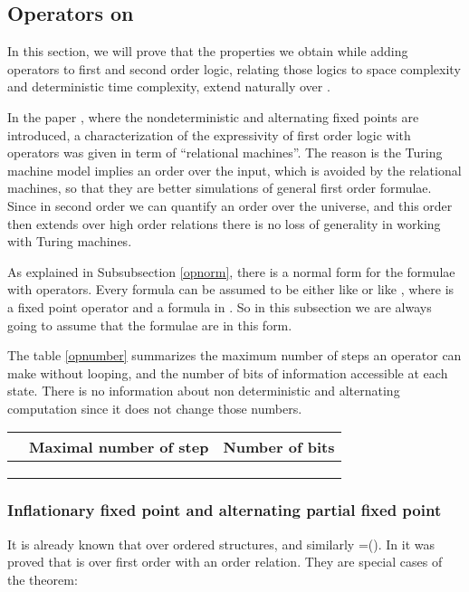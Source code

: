 \documentclass[a4paper,12pt]{article}
\newcommand{\sss}[1]{\subsubsection{#1}}
\theoremstyle{definition}
\begin{document}
\subsection{Operators on \HO}
In this section, we will prove that the properties we obtain while
adding operators to first and second order logic, relating those
logics to space complexity and deterministic time complexity, extend
naturally over \HO.

In the paper \cite{nfp}, where the nondeterministic and alternating
fixed points are introduced, a characterization of the expressivity of
first order logic with operators was given in term of ``relational
machines''. The reason is the Turing machine model implies an order
over the input, which is avoided by the relational machines, so that
they are better simulations of general first order formulae. Since in
second order we can quantify an order over the universe, and this
order then extends over high order relations there is no loss of
generality in working with Turing machines.

As explained in Subsubsection \ref{opnorm}, there is a normal form for
the formulae with operators. Every formula can be assumed to be
either like  or like , where  is a fixed point operator and  a
formula in . So in this subsection we are always going to assume
that the formulae are in this form.

The table \ref{opnumber} summarizes the maximum number of steps an operator
can make without looping, and the number of bits of information
accessible at each state. There is no information about non
deterministic and alternating computation since it does not change
those numbers.
\begin{table*}\caption{Numbers of the fixed point.}
\label{opnumber}
  \centering
    \begin{tabular}{|l|l|l|}
      \hline
      &Maximal number of step &Number of
      bits \\
      \hline
      &&\\
      &&\\
      &&\\
      \hline
    \end{tabular}
\end{table*}

\sss{Inflationary fixed point and alternating partial fixed point}
It is already known that  over ordered structures, and similarly
\EXP=\SO(\IFP).  In \cite{nfp} it was proved that {} is \NP{} over first
order with an order relation.  They are special cases of the theorem:
\end{document}

